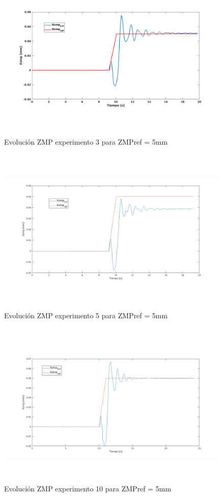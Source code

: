 \begin{figure}[H]
\centering
\includegraphics[width=13cm, height=8cm]{imagenes/apartado_5/5.1/56}
\caption{Evolución ZMP experimento 3 para ZMPref = 5mm }
\label{figura56}
\end{figure}

\begin{figure}[H]
\centering
\includegraphics[width=13cm, height=8cm]{imagenes/apartado_5/5.1/57}
\caption{Evolución ZMP experimento 5 para ZMPref = 5mm}
\label{figura57}
\end{figure}

\begin{figure}[H]
\centering
\includegraphics[width=13cm, height=8cm]{imagenes/apartado_5/5.1/58}
\caption{Evolución ZMP experimento 10 para ZMPref = 5mm}
\label{figura58}
\end{figure}


